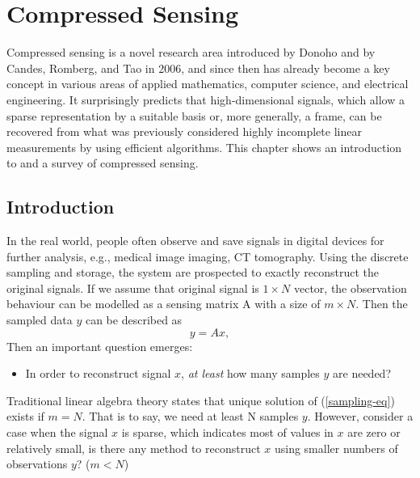 \chapter{Compressed Sensing}\label{C:compressed_sensing}

Compressed sensing is a novel research area introduced by Donoho \cite{donoho2006sparse} and by Candes, Romberg, and Tao \cite{candes2006robust} in 2006, and since then has already become a key concept in various areas of applied mathematics, computer science, and electrical engineering. It surprisingly predicts that high-dimensional signals, which allow a sparse representation by a suitable basis or, more generally, a frame, can be recovered from what was previously considered highly incomplete linear measurements by using efficient algorithms. This chapter shows an introduction to and a survey of compressed sensing.

\section{Introduction}\label{ch1:intro}

In the real world, people often observe and save signals in digital devices for further analysis, e.g., medical image imaging, CT tomography. Using the discrete sampling and storage, the system are prospected to exactly reconstruct the original signals. If we assume that original signal is $1 \times N$ vector, the observation behaviour can be modelled as a sensing matrix A with a size of $m \times N$. Then the sampled data $y$ can be described as
\begin{equation}
\label{sampling-eq}
y = Ax,
\end{equation}
Then an important question emerges:
\begin{itemize}
\item In order to reconstruct signal $x$, \emph{at least} how many samples $y$ are needed?
\end{itemize}
Traditional linear algebra theory states that unique solution of (\ref{sampling-eq}) exists if $m = N$. That is to say, we need at least N samples $y$.
However, consider a case when the signal $x$ is sparse, which indicates most of values in $x$ are zero or relatively small, is there any method to reconstruct $x$ using smaller numbers of observations $y$? ($m < N$)

